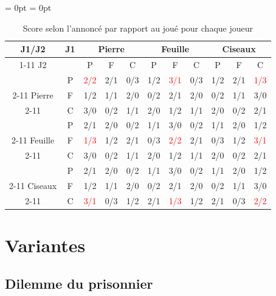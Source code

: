 \documentclass{article}
\begin{document}
\begin{table}[H]
\renewcommand{\arraystretch}{2}%
\centering
\aboverulesep = 0pt
\belowrulesep = 0pt
    \begin{tabular}{|c|c||c|c|c||c|c|c||c|c|c|}
        \toprule
        J1/J2  & J1 &  \multicolumn{3}{|c||}{Pierre} & \multicolumn{3}{c||}{Feuille} & \multicolumn{3}{c|}{Ciseaux}   \\ 
        \cmidrule{1-11}
          J2   &   & P &   F    & C & P &    F    & C & P &    F    & C \\ \midrule \midrule
              & P &\textcolor{red}{2/2}&  2/1   & 0/3 & 1/2 &  \textcolor{red}{3/1}  & 0/3 & 1/2 &   2/1   &\textcolor{red}{1/3}\\ 
        \cmidrule{2-11}
         Pierre & F & 1/2 &  1/1   & 2/0 & 0/2 &   2/1   & 2/0 & 0/2 &   1/1   & 3/0 \\ 
        \cmidrule{2-11}
               & C & 3/0 &  0/2   & 1/1 & 2/0 &   1/2   & 1/1 & 2/0 &   0/2   & 2/1 \\ \midrule \midrule
               & P & 2/1 &  2/0   & 0/2 & 1/1 &   3/0   & 0/2 & 1/1 &   2/0   & 1/2 \\ 
        \cmidrule{2-11}
        Feuille& F &\textcolor{red}{1/3}&  1/2   & 2/1 & 0/3 &  \textcolor{red}{2/2}  & 2/1 & 0/3 &   1/2   &\textcolor{red}{3/1}\\ 
        \cmidrule{2-11}
               & C & 3/0 &  0/2   & 1/1 & 2/0 &   1/2   & 1/1 & 2/0 &   0/2   & 2/1 \\ \midrule \midrule
               & P & 2/1 &  2/0   & 0/2 & 1/1 &   3/0   & 0/2 & 1/1 &   2/0   & 1/2 \\ 
        \cmidrule(l){2-11}
        Ciseaux& F & 1/2 &  1/1   & 2/0 & 0/2 &   2/1   & 2/0 & 0/2 &   1/1   & 3/0\\ 
        \cmidrule{2-11}
               & C &\textcolor{red}{3/1}& 0/3  & 1/2 & 2/1 &  \textcolor{red}{1/3}  & 1/2 & 2/1 &  0/3  &\textcolor{red}{2/2}\\ \bottomrule
    \end{tabular}
    \caption{Score selon l'annoncé par rapport au joué pour chaque joueur}
\end{table}
\newpage
\section{Variantes}

\subsection{Dilemme du prisonnier}
\label{variante:prison}
\end{document}

